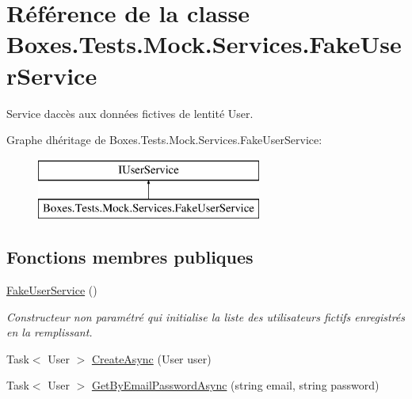 \hypertarget{class_boxes_1_1_tests_1_1_mock_1_1_services_1_1_fake_user_service}{}\section{Référence de la classe Boxes.\+Tests.\+Mock.\+Services.\+Fake\+User\+Service}
\label{class_boxes_1_1_tests_1_1_mock_1_1_services_1_1_fake_user_service}


Service d\textquotesingle{}accès aux données fictives de l\textquotesingle{}entité User.  


Graphe d\textquotesingle{}héritage de Boxes.\+Tests.\+Mock.\+Services.\+Fake\+User\+Service\+:\begin{figure}[H]
\begin{center}
\leavevmode
\includegraphics[height=2.000000cm]{class_boxes_1_1_tests_1_1_mock_1_1_services_1_1_fake_user_service}
\end{center}
\end{figure}
\subsection*{Fonctions membres publiques}
\begin{DoxyCompactItemize}
\item 
\hyperlink{class_boxes_1_1_tests_1_1_mock_1_1_services_1_1_fake_user_service_a5b1402a2539d6fd5752c0f25eac9323b}{Fake\+User\+Service} ()
\begin{DoxyCompactList}\small\item\em Constructeur non paramétré qui initialise la liste des utilisateurs fictifs enregistrés en la remplissant. \end{DoxyCompactList}\item 
Task$<$ User $>$ \hyperlink{class_boxes_1_1_tests_1_1_mock_1_1_services_1_1_fake_user_service_a2b5d63cda26573ad15b5d23995fb17fa}{Create\+Async} (User user)
\item 
Task$<$ User $>$ \hyperlink{class_boxes_1_1_tests_1_1_mock_1_1_services_1_1_fake_user_service_a87bb40d334a24116d98982b37232c492}{Get\+By\+Email\+Password\+Async} (string email, string password)
\end{DoxyCompactItemize}
